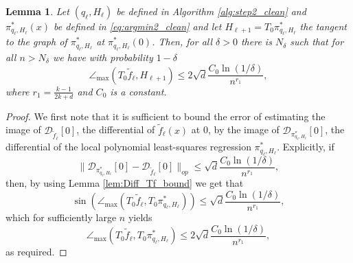 \documentclass[12pt]{article}
\newtheorem{Lemma}[Theorem]{Lemma}
\theoremstyle{remark}
\newcommand{\DD}{\mathcal{D}}
\newcommand{\wtilde}[1]{\widetilde{#1}}
\newcommand{\maxangle}{\angle_{\max}}
\begin{document}
\begin{appendices}
\begin{Lemma}\label{lem:AngleImprovement}
	Let $(q_\ell, H_\ell)$ be defined in Algorithm \ref{alg:step2_clean} and $ \pi^*_{q_\ell, H_\ell}(x) $ be defined in \eqref{eq:argmin2_clean} and let $ H_{\ell + 1} = T_0 \pi^*_{q_\ell, H_\ell} $ the tangent to the graph of $ \pi^*_{q_\ell, H_\ell} $ at $ \pi^*_{q_\ell, H_\ell}(0) $.
	Then, for all $ \delta>0 $ there is $ N_\delta $ such that for all $ n > N_\delta $ we have with probability $ 1-\delta $
	\[
	\maxangle(T_0\wtilde f_\ell, H_{\ell + 1}) \leq 2\sqrt{d}\frac{C_0 \ln(1/\delta)}{n ^{r_1}}
	,\]
	where ${r_1} = \frac{k-1}{2k + d}$ and $C_0$ is a constant.
\end{Lemma}
\begin{proof}
We first note that it is sufficient to bound the error of estimating the image of $\DD_{\wtilde{f}_\ell}[0]$, the differential of $ \wtilde f_\ell(x) $ at 0, by the image of $ \DD_{\pi^*_{q_\ell, H_\ell}}[0] $, the differential of the local polynomial least-squares regression $\pi^*_{q_\ell, H_\ell}$.
Explicitly, if 
\[
\|{\DD_{\pi^*_{q_\ell, H_\ell}}[0] - \DD_{ \wtilde f_\ell}[0]}\|_{op} \leq \sqrt{d}\frac{C_0 \ln(1/\delta)}{n^{r_1}}
,\]
then, by using Lemma \ref{lem:Diff_Tf_bound} we get that
\[
\sin(\maxangle(T_0\wtilde f_\ell, T_0\pi^*_{q_\ell, H_\ell})) \leq \sqrt{d}\frac{C_0 \ln(1/\delta)}{n^{r_1}}
,\]
which for sufficiently large $ n $ yields
\[
\maxangle(T_0\wtilde f_\ell, T_0\pi^*_{q_\ell, H_\ell}) \leq 2\sqrt{d}\frac{C_0 \ln(1/\delta)}{n^{r_1}}
,\]
as required.


\end{proof}
\end{appendices}
\end{document}
